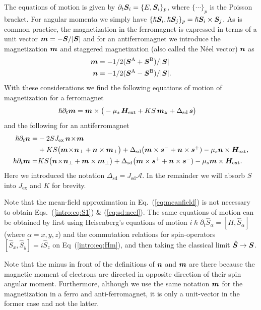 The equations of motion is given by $\partial_t \boldsymbol{S}_i = \{E,\boldsymbol{S}_i\}_p$, where $\{\cdots\}_p$ is the Poisson bracket. For angular momenta we simply have $\{\hslash \boldsymbol{S}_i,\hslash \boldsymbol{S}_j\}_p=\hslash \boldsymbol{S}_i\times\boldsymbol{S}_j$. As is common practice, the magnetization in the ferromagnet is expressed in terms of a unit vector $\boldsymbol{m} = -\boldsymbol{S}/|\boldsymbol{S}|$ and for an antiferromagnet we introduce the magnetization $\boldsymbol{m}$ and staggered magnetization (also called the N\'eel vector) $\boldsymbol{n}$ as
\begin{align}
 	\boldsymbol{m} & =-1/2(\boldsymbol{S}^\text{A}+\boldsymbol{S}^\text{B})/|\boldsymbol{S}|\\
    \boldsymbol{n} & =-1/2(\boldsymbol{S}^\text{A}-\boldsymbol{S}^\text{B})/|\boldsymbol{S}|.
\end{align} 
With these considerations we find the following equations of motion of magnetization for a ferromagnet
\begin{align}
	\hslash \partial_t \boldsymbol{m}  & = \boldsymbol{m}\times\big(-\mu_s\,\boldsymbol{H}_\text{ext}+KS \,\boldsymbol{m_z}+\Delta_\text{sd}\,\boldsymbol{s}\big)
	\label{intro:eq:S1}
\end{align}
and the following for an antiferromagnet
\begin{align}
\hslash \partial_t \boldsymbol{n} = &  -2SJ_\text{ex}\, \boldsymbol{n}\!\times\!\boldsymbol{m} \nonumber\\
     &  + KS \big(\boldsymbol{m}\!\times\!\boldsymbol{n}_\perp+\boldsymbol{n}\times\boldsymbol{m}_\perp\big) 
	+ \Delta_\text{sd} \big(\boldsymbol{m}\times\boldsymbol{s}^-+\boldsymbol{n}\times\boldsymbol{s}^+) -\mu_s\boldsymbol{n}\times\boldsymbol{H}_\text{ext},\\
\hslash \partial_t \boldsymbol{m} = & KS  \big(\boldsymbol{n}\!\times\!\boldsymbol{n}_\perp+\boldsymbol{m}\times\boldsymbol{m}_\perp\big) 
	+ \Delta_\text{sd} \big(\boldsymbol{m}\times\boldsymbol{s}^++\boldsymbol{n}\times\boldsymbol{s}^-)-\mu_s\boldsymbol{m}\times\boldsymbol{H}_\text{ext}.
	\label{eq:sd:neel}
\end{align}
Here we introduced the notation $\Delta_\text{sd} = J_\text{sd}\mathcal{A}$. In the remainder we will absorb $S$ into $J_\text{ex}$ and $K$ for brevity. 

Note that the mean-field approximation in Eq.~(\ref{eq:meanfield}) is not necessary to obtain Eqs.~(\ref{intro:eq:S1}) \& (\ref{eq:sd:neel}). The same equations of motion can be obtained by first using Heisenberg's equations of motion $i \hslash\partial_t \hat{S}_\alpha = [H,\hat{S}_\alpha]$ (where $\alpha=x,y,z$) and the commutation relations for spin-operators $[\hat{S}_x, \hat{S}_y]=i\hat{S}_z$ on Eq~(\ref{intro:eq:Hm}), and then taking the classical limit $\hat{\boldsymbol{S}}\rightarrow \boldsymbol{S}$. 

Note that the minus in front of the definitions of $\boldsymbol{n}$ and $\boldsymbol{m}$ are there because the magnetic moment of electrons are directed in opposite direction of their spin angular moment. Furthermore, although we use the same notation $\boldsymbol{m}$ for the magnetization in a ferro and anti-ferromagnet, it is only a unit-vector in the former case and not the latter. 

